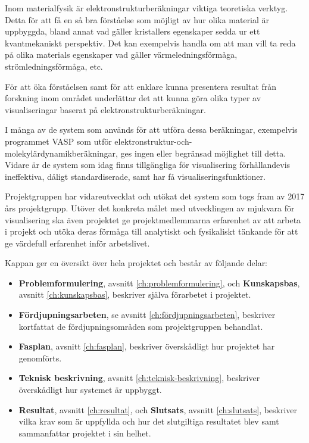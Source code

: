 \documentclass[a4paper,12pt]{article}
\begin{document}
Inom materialfysik är elektronstrukturberäkningar viktiga teoretiska verktyg. Detta för att få en så bra förståelse som möjligt av hur olika material är uppbyggda, bland annat vad gäller kristallers egenskaper sedda ur ett kvantmekaniskt perspektiv. Det kan exempelvis handla om att man vill ta reda på olika materials egenskaper vad gäller värmeledningsförmåga, strömledningsförmåga, etc.

För att öka förståelsen samt för att enklare kunna presentera resultat från forskning inom området underlättar det att kunna göra olika typer av visualiseringar baserat på elektronstrukturberäkningar.

I många av de system som används för att utföra dessa beräkningar, exempelvis programmet VASP som utför elektronstruktur-och-molekylärdynamikberäkningar, ges ingen eller begränsad möjlighet till detta. Vidare är de system som idag finns tillgängliga för visualisering förhållandevis ineffektiva, dåligt standardiserade, samt har få visualiseringsfunktioner.

Projektgruppen har vidareutvecklat och utökat det system som togs fram av 2017 års projektgrupp. Utöver det konkreta målet med utvecklingen av mjukvara för visualisering ska även projektet ge projektmedlemmarna erfarenhet av att arbeta i projekt och utöka deras förmåga till analytiskt och fysikaliskt tänkande för att ge värdefull erfarenhet inför arbetslivet.

Kappan ger en översikt över hela projektet och består av följande delar:

\begin{itemize}
	\item \textbf{Problemformulering}, avsnitt \ref{ch:problemformulering}, och \textbf{Kunskapsbas}, avsnitt \ref{ch:kunskapsbas}, beskriver själva förarbetet i projektet.
	
	\item \textbf{Fördjupningsarbeten}, se avsnitt \ref{ch:fördjupningsarbeten}, beskriver kortfattat de fördjupningsområden som projektgruppen behandlat.
	
	\item \textbf{Fasplan}, avsnitt \ref{ch:fasplan}, beskriver överskådligt hur projektet har genomförts.

	\item \textbf{Teknisk beskrivning}, avsnitt \ref{ch:teknisk-beskrivning}, beskriver överskådligt hur systemet är uppbyggt.
	
	\item \textbf{Resultat}, avsnitt \ref{ch:resultat}, och \textbf{Slutsats}, avsnitt \ref{ch:slutsats}, beskriver vilka krav som är uppfyllda och hur det slutgiltiga resultatet blev samt sammanfattar projektet i sin helhet.
\end{itemize}
\end{document}
